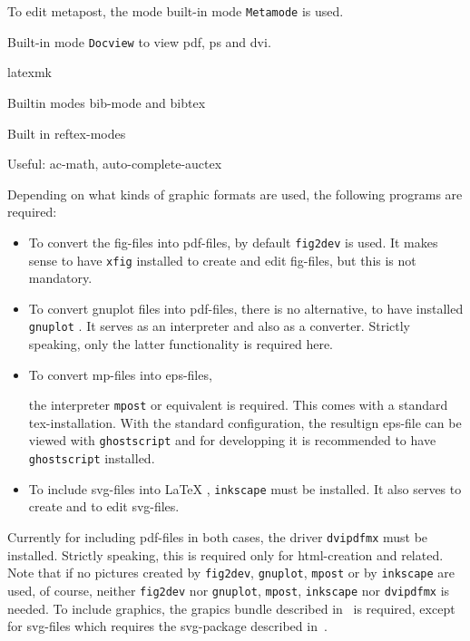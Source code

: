 \documentclass[12pt]{book}
\newcommand{\gls}[1]{#1}
\renewcommand{\index}[1]{ }
\begin{document}
To edit metapost, the mode built-in mode \texttt{Metamode} is used. 

Built-in mode \texttt{Docview} to view pdf, ps and dvi. 

latexmk

Builtin modes bib-mode and bibtex

Built in reftex-modes

Useful: 
ac-math, auto-complete-auctex

Depending on what kinds of graphic formats are used, 
the following programs are required: 
%
\begin{itemize}
\item
To convert the \gls{fig}-files into \gls{pdf}-files, 
by default \texttt{fig2dev}\index{fig2dev} is used. 
It makes sense to have \texttt{xfig}\index{xfig} installed 
to create and edit fig-files, but this is not mandatory. 
\item
To convert gnuplot files into pdf-files, there is no alternative, 
to have installed \texttt{gnuplot}\index{gnuplot}. 
It serves as an interpreter and also as a converter. 
Strictly speaking, only the latter functionality is required here. 
\item
To convert \gls{mp}-files into \gls{eps}-files, 
\index{mpost}\index{metapost}
the interpreter \texttt{mpost} or equivalent is required. 
This comes with a standard tex-installation. 
With the standard configuration, 
the resultign eps-file can be viewed with \texttt{ghostscript} 
and for developping it is recommended to have \texttt{ghostscript} installed. 
\item
To include \gls{svg}-files into \LaTeX\index{svg}, 
\texttt{inkscape}\index{inkscape} must be installed. 
It also serves to create and to edit svg-files. 
\end{itemize}



Currently for including pdf-files in both cases, 
the driver \texttt{dvipdfmx} must be installed. 
Strictly speaking, this is required only for html-creation and related. 
Note that if no pictures created by \texttt{fig2dev}, \texttt{gnuplot}, 
\texttt{mpost} or by \texttt{inkscape} are used, of course, 
neither \texttt{fig2dev} nor \texttt{gnuplot}, \texttt{mpost}, \texttt{inkscape} 
nor \texttt{dvipdfmx} is needed. 
To include graphics, the grapics bundle described in~\cite{GraX} is required, 
except for svg-files which requires the svg-package 
described in~\cite{SvgP}. 
\end{document}
